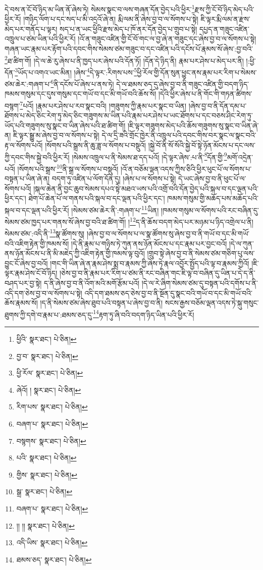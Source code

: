 དེ་བས་ན་ངོ་བོ་ཉིད་མ་ཡིན་ནོ་ཞེས་ཏེ། སེམས་སྣང་བ་ལས་གཞན་དོན་བྱེད་པའི་ཕྱིར་\footnote{ཕྱིའི་  སྣར་ཐང་།  པེ་ཅིན། }རྫས་ཀྱི་ངོ་བོ་ཉིད་མེད་པའི་ཕྱིར་རོ། །གཉིད་ལོག་པ་དང་སད་པ་མི་འདྲའོ་ཞེ་ན། རྨི་ལམ་ནི་ཞེས་བྱ་བ་ལ་སོགས་པ་སྟེ། ཇི་ལྟར་རྨི་ལམ་ན་རྫས་མེད་པར་གནོད་པ་ལྟར། སད་པ་ན་ཡང་ཕྱིའི་རྫས་མེད་པ་ཁོ་ནར་དོན་བྱེད་པ་གྲུབ་པ་སྟེ། དཔྱད་ན་གཟུང་འཛིན་འཁྲུལ་པ་ཙམ་ཡིན་པའི་ཕྱིར་རོ། །འོ་ན་གཟུང་འཛིན་གྱི་ངོ་བོ་གང་ལ་བྱ་ཞེ་ན་གཟུང་དང་ཞེས་བྱ་བ་ལ་སོགས་པ་སྟེ། གཞན་ཡང་རྣམ་པར་རྟོག་པའི་དབང་གིས་སེམས་ཙམ་གཟུང་བ་དང་འཛིན་པའི་དངོས་པོ་རྣམས་སོ་ཞེས་:བྱ་བའི་\footnote{བྱ་བ་  སྣར་ཐང་།  པེ་ཅིན། }ཐ་ཚིག་གོ། །དེ་ལ་ཆེ་རུ་ཞེས་པ་ནི་ཁྱད་པར་ཞེས་པའི་དོན་ཏོ། །དོན་དེ་ཉིད་ནི། རྣམ་པར་ཤེས་པ་མེད་པར་ནི། །:ཕྱི་དོན་\footnote{ཕྱི་རོལ་  སྣར་ཐང་།  པེ་ཅིན། }ཡོད་པ་འགའ་ཡང་མིན། །ཞེས་\footnote{ཞེའོ། །  སྣར་ཐང་།  པེ་ཅིན། }དེ་ལྟར་:རིགས་པས་\footnote{རིག་པས་  སྣར་ཐང་།  པེ་ཅིན། }ཕྱི་རོལ་གྱི་དོན་སུན་ཕྱུང་ནས་རྣམ་པར་རིག་པ་སེམས་ཙམ་ཆེར་:གཞག་པ་\footnote{བཞག་པ་  སྣར་ཐང་།  པེ་ཅིན། }ནི་དངོས་པོ་ཞེས་པ་ནས་ཏེ། དེ་ལ་ཐམས་ཅད་དུ་ཞེས་བྱ་བ་ནི་གཟུང་འཛིན་གྱི་བདག་ཉིད་ཁམས་གསུམ་དང་དུས་གསུམ་དང་གཡོ་བ་དང་མི་གཡོ་བའི་ཆོས་སོ། །དེའི་ཕྱིར་ཞེས་པ་ནི་གོང་གི་གཏན་ཚིགས་བསྙག་\footnote{བསྙགས་  སྣར་ཐང་།  པེ་ཅིན། }པའོ། །རྣམ་པར་ཤེས་པ་རབ་སྣང་བའི། །གཟུགས་ཀྱི་རྣམ་པར་སྣང་བ་ཡིན། །ཞེས་བྱ་བ་ནི་དོན་དམ་པ་ཐོགས་པ་མེད་ཅིང་རེག་ཏུ་མེད་ཅིང་གཟུགས་མ་ཡིན་པའི་རྣམ་པར་ཤེས་པ་ཡང་ཐོགས་པ་དང་བཅས་ཤིང་རེག་ཏུ་ཡོད་པའི་གཟུགས་སུ་སྣང་བ་ཡིན་ཞེས་པའི་ཐ་ཚིག་གོ། །ཇི་ལྟར་གཟུགས་མེད་པའི་ཆོས་གཟུགས་སུ་སྣང་བ་ཡིན་ཞེ་ན། ཇི་ལྟར་སྒྱུ་མ་ཞེས་བྱ་བ་ལ་སོགས་པ་སྟེ། དེ་ལ་དྲི་ཟའི་གྲོང་ཁྱེར་ནི་འཁྲུལ་པའི་དབང་གིས་བར་སྣང་ལ་སྣང་བའི་རྟ་ལ་སོགས་པའོ། །སོགས་པའི་སྒྲས་ནི་ཆུ་ཟླ་ལ་སོགས་པ་བསྡུའོ། །སྐྱེ་བོ་ནི་སོ་སོའི་སྐྱེ་བོ་སྟེ་ཉོན་མོངས་པ་དང་ལས་ཀྱི་དབང་གིས་སྐྱེ་བའི་ཕྱིར་རོ། །སེམས་འཁྲུལ་པ་ནི་སེམས་ཐ་དད་པའོ། །དེ་ལྟར་ཞེས་:པ་ནི་\footnote{པའི་  སྣར་ཐང་།  པེ་ཅིན། }དོན་གྱི་\footnote{གྱིས་  སྣར་ཐང་།  པེ་ཅིན། }མགོ་འདྲེན་པའོ། །སོགས་པའི་སྒྲས་\footnote{སྒྲ་  སྣར་ཐང་།  པེ་ཅིན། }ནི་སྒྲ་ལ་སོགས་པ་བསྡུའོ། །འོ་ན་བཅོམ་ལྡན་འདས་ཀྱིས་ཅིའི་ཕྱིར་ཕུང་པོ་ལ་སོགས་པ་བསྟན་པ་ཡིན་ཞེ་ན། བདག་ཏུ་འཛིན་པ་ལོག་དོན་དུ། །ཞེས་པ་ལ་སོགས་པ་སྟེ། དེ་ཡང་ཞེས་བྱ་བ་ནི་ཕུང་པོ་ལ་སོགས་པའོ། །སྐལ་ཆེན་ནི་བྱང་ཆུབ་སེམས་དཔའ་སྟེ་མཐའ་ཡས་པའི་འགྲོ་བའི་དོན་བྱེད་པའི་སྐལ་བ་དང་ལྡན་པའི་ཕྱིར་དང་། ཐེག་པོ་ཆེན་པོ་ལ་གནས་པའི་སྐལ་བ་དང་ལྡན་པའི་ཕྱིར་དང་། ཁམས་གསུམ་གྱི་མཆོད་པས་མཆོད་པའི་སྐལ་བ་དང་ལྡན་པའི་ཕྱིར་རོ། །སེམས་ཙམ་ཆེར་ནི་:གཞག་པ་\footnote{བཞག་པ་  སྣར་ཐང་།  པེ་ཅིན། }ཡིན། །ཁམས་གསུམ་ལ་སོགས་པའི་རང་བཞིན་དུ་སེམས་ཙམ་ཁྱད་པར་གནས་སོ་ཞེས་བྱ་བའི་ཐ་ཚིག་གོ། །\footnote{།། །།  སྣར་ཐང་།  པེ་ཅིན། }ད་ནི་ཆོས་བདག་མེད་པར་མཉམ་པ་ཉིད་འགྲེལ་པ་ནི། སེམས་ཙམ་:འདི་ནི་\footnote{འདི་ཡིས་  སྣར་ཐང་།  པེ་ཅིན། }སྣ་ཚོགས་སུ། །ཞེས་བྱ་བ་ལ་སོགས་པ་ལ་སྣ་ཚོགས་སུ་ཞེས་བྱ་བ་ནི་གཡོ་བ་དང་མི་གཡོ་བའི་འཇིག་རྟེན་གྱི་ཁམས་སོ། །དེ་ནི་རྣམ་པ་གཉིས་ཏེ་ཀུན་ནས་ཉོན་མོངས་པ་དང་རྣམ་པར་བྱང་བའོ། །དེ་ལ་ཀུན་ནས་ཉོན་མོངས་པ་ནི་མི་མཇེད་ཀྱི་འཇིག་རྟེན་གྱི་ཁམས་ལྟ་བུའོ། །གྲུབ་སྟེ་ཞེས་བྱ་བ་ནི་སེམས་ཙམ་གཅིག་པུ་ལས་བྱུང་ངོ་ཞེས་བྱ་བའོ། །གང་གི་ཡིན་ཞེ་ན་རྣམ་ཤེས་སྨྲ་བ་རྣམས་ཀྱི་ཞེས་ཏེ་རྣལ་འབྱོར་སྤྱོད་པའི་ལྟ་བ་རྣམས་ཀྱིའོ། །ཇི་ལྟར་རྣམ་ཤེས་ངོ་བོ་ཉིད། །ཅེས་བྱ་བ་ནི་རྣམ་པར་རིག་པ་ཙམ་ནི་རང་བཞིན་གང་ཇི་ལྟ་བ་བཞིན་དུ་ཡིན་པ་དེ་ད་ནི་བཤད་པར་བྱ་སྟེ། ད་ནི་ཞེས་བྱ་བ་ནི་འོག་མའི་མགོ་རྩོམ་པའོ། །དེ་ལ་རེ་ཞིག་སེམས་ཙམ་དུ་བསྟན་པའི་དགོས་པ་ནི་འདི་དག་ཅེས་བྱ་བ་ལ་སོགས་པ་སྟེ། འདི་དག་ཐམས་ཅད་ཅེས་བྱ་བ་ནི་སྔོན་དུ་སྣང་བའི་གཡོ་བ་དང་མི་གཡོ་བའི་ཆོས་རྣམས་སོ། །ད་ནི་སེམས་ཙམ་ཞེས་ཐུབ་པའི་བསྟན་པ་ཞེས་བྱ་བ་ནི། སངས་རྒྱས་བཅོམ་ལྡན་འདས་ཏེ་སྐུ་གསུང་ཐུགས་ཀྱི་དགེ་བ་རྣམ་པ་:ཐམས་ཅད་དུ་\footnote{ཐམས་ཅད་  སྣར་ཐང་།  པེ་ཅིན། }རྟག་ཏུ་ཞི་བའི་བདག་ཉིད་ཡིན་པའི་ཕྱིར་རོ། 